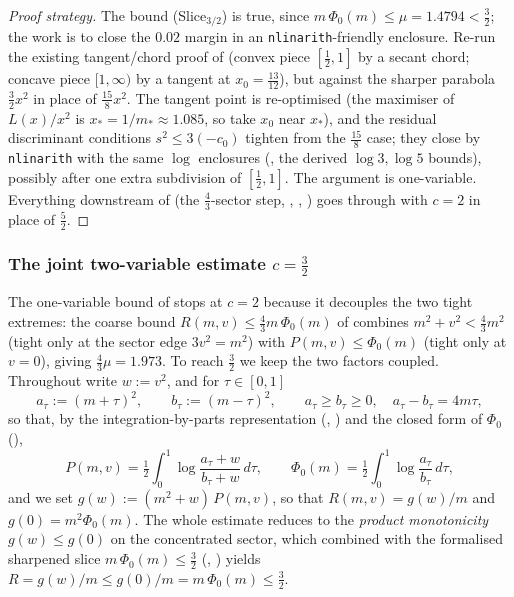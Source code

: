 \begin{proof}[Proof strategy]
\leanok
The bound \textup{(Slice$_{3/2}$)} is true, since $m\,\Phi_0(m)\le\mu=1.4794<\tfrac32$; the
work is to close the $0.02$ margin in an \texttt{nlinarith}-friendly enclosure.
Re-run the existing tangent/chord proof of 
(convex piece $[\tfrac12,1]$ by a secant chord; concave piece $[1,\infty)$ by a
tangent at $x_0=\tfrac{13}{12}$), but against the sharper parabola $\tfrac32 x^2$
in place of $\tfrac{15}8 x^2$. The tangent point is re-optimised (the maximiser
of $L(x)/x^2$ is $x_\ast=1/m_\ast\approx1.085$, so take $x_0$ near $x_\ast$), and the
residual discriminant conditions $s^2\le 3(-c_0)$ tighten from the $\tfrac{15}8$ case;
they close by \texttt{nlinarith} with the same $\log$ enclosures
(, the derived $\log3,\log5$ bounds), possibly after one
extra subdivision of $[\tfrac12,1]$. The argument is one-variable. Everything downstream of
 (the $\tfrac43$-sector step, ,
, ) goes through with $c=2$ in place of
$\tfrac52$.
\end{proof}

\subsubsection*{The joint two-variable estimate \texorpdfstring{$c=\tfrac32$}{c=3/2}}

The one-variable bound of  stops at $c=2$ because it decouples the two tight
extremes: the coarse bound $R(m,v)\le\tfrac43 m\,\Phi_0(m)$ of
 combines $m^2+v^2<\tfrac43 m^2$ (tight only at the sector
edge $3v^2=m^2$) with $P(m,v)\le\Phi_0(m)$ (tight only at $v=0$), giving
$\tfrac43\mu=1.973$. To reach $\tfrac32$ we keep the two factors coupled. Throughout
write $w:=v^2$, and for $\tau\in[0,1]$
\[
  a_\tau:=(m+\tau)^2,\qquad b_\tau:=(m-\tau)^2,\qquad a_\tau\ge b_\tau\ge0,\quad
  a_\tau-b_\tau=4m\tau,
\]
so that, by the integration-by-parts representation
(, )
and the closed form of $\Phi_0$ (),
\begin{equation}
  P(m,v)=\tfrac12\int_0^1\log\frac{a_\tau+w}{b_\tau+w}\,d\tau,
  \qquad
  \Phi_0(m)=\tfrac12\int_0^1\log\frac{a_\tau}{b_\tau}\,d\tau,
  \tag{IBP}
  \label{eq:ls_r2_ibp}
\end{equation}
and we set $g(w):=(m^2+w)\,P(m,v)$, so that $R(m,v)=g(w)/m$ and
$g(0)=m^2\Phi_0(m)$. The whole estimate reduces to the \emph{product monotonicity}
$g(w)\le g(0)$ on the concentrated sector, which combined with the formalised
sharpened slice $m\,\Phi_0(m)\le\tfrac32$ (,
) yields
$R=g(w)/m\le g(0)/m=m\,\Phi_0(m)\le\tfrac32$.

